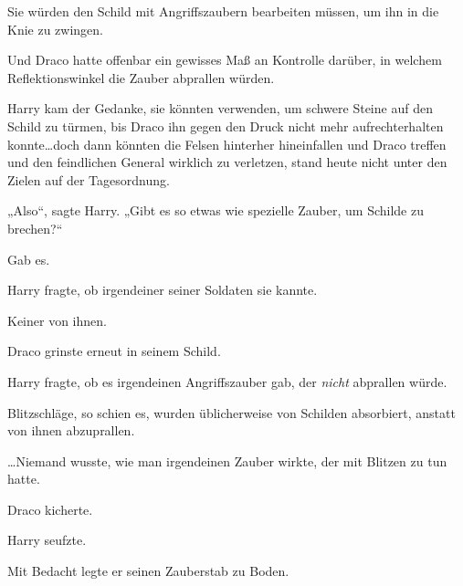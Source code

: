 Sie würden den Schild mit Angriffszaubern bearbeiten müssen, um ihn in die Knie zu zwingen.

Und Draco hatte offenbar ein gewisses Maß an Kontrolle darüber, in welchem Reflektionswinkel die Zauber abprallen würden.

Harry kam der Gedanke, sie könnten  verwenden, um schwere Steine auf den Schild zu türmen, bis Draco ihn gegen den Druck nicht mehr aufrechterhalten konnte…doch dann könnten die Felsen hinterher hineinfallen und Draco treffen und den feindlichen General wirklich zu verletzen, stand heute nicht unter den Zielen auf der Tagesordnung.

„Also“, sagte Harry.
„Gibt es so etwas wie spezielle Zauber, um Schilde zu brechen?“

Gab es.

Harry fragte, ob irgendeiner seiner Soldaten sie kannte.

Keiner von ihnen.

Draco grinste erneut in seinem Schild.

Harry fragte, ob es irgendeinen Angriffszauber gab, der \emph{nicht} abprallen würde.

Blitzschläge, so schien es, wurden üblicherweise von Schilden absorbiert, anstatt von ihnen abzuprallen.

…Niemand wusste, wie man irgendeinen Zauber wirkte, der mit Blitzen zu tun hatte.

Draco kicherte.

Harry seufzte.

Mit Bedacht legte er seinen Zauberstab zu Boden.

